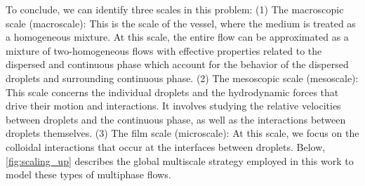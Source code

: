 To conclude, we can identify three scales in this problem:
(1) The macroscopic scale (macroscale): This is the scale of the vessel, where the medium is treated as a homogeneous mixture. 
At this scale, the entire flow can be approximated as a mixture of two-homogeneous flows with effective properties related to the dispersed and continuous phase which account for the behavior of the dispersed droplets and surrounding continuous phase.
(2) The mesoscopic scale (mesoscale): This scale concerns the individual droplets and the hydrodynamic forces that drive their motion and interactions. It involves studying the relative velocities between droplets and the continuous phase, as well as the interactions between droplets themselves.
(3) The film scale (microscale): At this scale, we focus on the colloidal interactions that occur at the interfaces between droplets. 
Below, \ref{fig:scaling_up} describes the global multiscale strategy employed in this work to model these types of multiphase flows.
